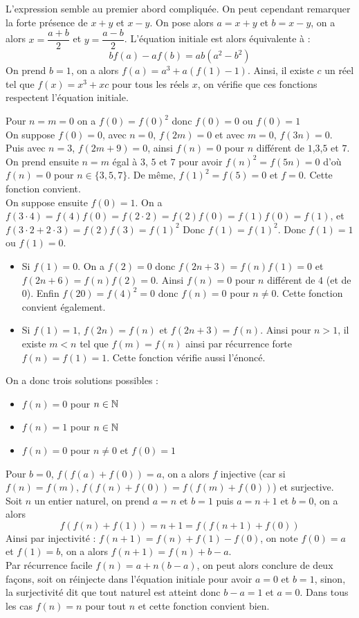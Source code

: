 \begin{sol}[][7]
L'expression semble au premier abord compliquée. On peut cependant remarquer la forte présence de $x+y$ et $x-y$. On pose alors $a=x+y$ et $b=x-y$, on a alors $x=\dfrac{a+b}2$ et $y=\dfrac{a-b}2$. L'équation initiale est alors équivalente à : $$bf(a)-af(b)=ab(a^2-b^2)$$ On prend $b=1$, on a alors $f(a)=a^3+a(f(1)-1)$. Ainsi, il existe $c$ un réel tel que $f(x)=x^3+xc$ pour tous les réels $x$, on vérifie que ces fonctions respectent l'équation initiale.
\end{sol}
\begin{sol}[][8]
Pour $n=m=0$ on a $f(0)=f(0)^2$ donc $f(0)=0$ ou $f(0)=1$\\
On suppose $f(0)=0$, avec $n=0$, $f(2m)=0$ et avec $m=0$, $f(3n)=0$. Puis avec $n=3$, $f(2m+9)=0$, ainsi $f(n)=0$ pour $n$ différent de $1$,$3$,$5$ et $7$. On prend ensuite $n=m$ égal à $3$, $5$ et $7$ pour avoir $f(n)^2=f(5n)=0$ d'où $f(n)=0$ pour $n\in\{3,5,7\}$. De même, $f(1)^2=f(5)=0$ et $f=0$. Cette fonction convient.\\
On suppose ensuite $f(0)=1$. On a $f(3 \cdot 4) = f(4)f(0) = f(2 \cdot 2) = f(2)f(0) = f(1)f(0) = f(1)$, et $f(3 \cdot2 +
2 \cdot 3) = f(2)f(3) = f(1)^2$ Donc $f(1) = f(1)^2$. Donc $f(1) = 1$ ou $f(1) = 0$.\\
\begin{itemize}
    \item Si $f(1)=0$. On a $f(2)=0$ donc $f(2n+3)=f(n)f(1)=0$ et $f(2n+6)=f(n)f(2)=0$. Ainsi $f(n)=0$ pour $n$ différent de $4$ (et de $0$). Enfin $f(20)=f(4)^2=0$ donc $f(n)=0$ pour $n\ne 0$. Cette fonction convient également.
    \item Si $f(1)=1$, $f(2n)=f(n)$ et $f(2n+3)=f(n)$. Ainsi pour $n>1$, il existe $m<n$ tel que $f(m)=f(n)$ ainsi par récurrence forte $f(n)=f(1)=1$. Cette fonction vérifie aussi l'énoncé.
\end{itemize}
On a donc trois solutions possibles :
\begin{itemize}
    \item $f(n)=0$ pour $n\in\mathbb N$
    \item $f(n)=1$ pour $n\in\mathbb N$
    \item $f(n)=0$ pour $n\ne 0$ et $f(0)=1$
\end{itemize}
\end{sol}
\begin{sol}[][9]
Pour $b=0$, $f(f(a)+f(0))=a$, on a alors $f$ injective (car si $f(n)=f(m)$, $f(f(n)+f(0))=f(f(m)+f(0))$) et surjective.\\
Soit $n$ un entier naturel, on prend $a=n$ et $b=1$ puis $a=n+1$ et $b=0$, on a alors
$$f(f(n)+f(1))=n+1=f(f(n+1)+f(0))$$
Ainsi par injectivité : $f(n+1)=f(n)+f(1)-f(0)$, on note $f(0)=a$ et $f(1)=b$, on a alors $f(n+1)=f(n)+b-a$.\\
Par récurrence facile $f(n)=a+n(b-a)$, on peut alors conclure de deux façons, soit on réinjecte dans l'équation initiale pour avoir $a=0$ et $b=1$, sinon, la surjectivité dit que tout naturel est atteint donc $b-a=1$ et $a=0$. Dans tous les cas $f(n)=n$ pour tout $n$ et cette fonction convient bien.
\end{sol}
